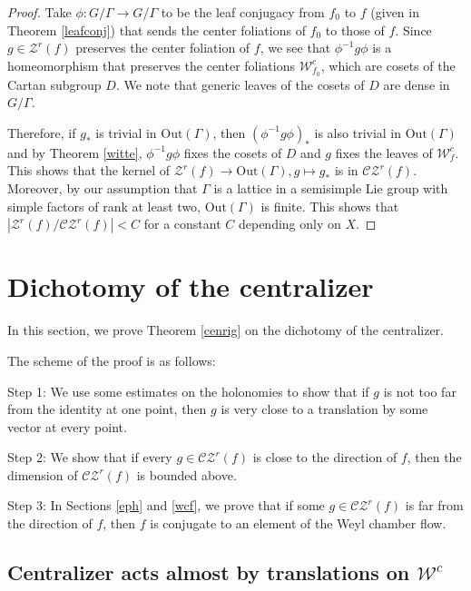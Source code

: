 \documentclass[11pt]{amsart}
\numberwithin{equation}{section}
\newcommand{\W}{\mathcal{W}}
\newcommand{\CZ}{\mathcal{CZ}}
\theoremstyle{plain}
\begin{document}
\begin{proof}
Take $\phi: G/\Gamma\to G/\Gamma$ to be the leaf conjugacy from $f_0$ to $f$ (given in Theorem \ref{leafconj}) that sends the center foliations of $f_0$ to those of $f$. Since $g\in \mathcal{Z}^r(f)$ preserves the center foliation of $f$, we see that $\phi^{-1} g\phi$ is a homeomorphism that preserves the center foliations $\W^c_{f_0}$, which are cosets of the Cartan subgroup $D$. We note that generic leaves of the cosets of $D$ are dense in $G/\Gamma$.

Therefore, if $g_*$ is trivial in $\mathrm{Out}(\Gamma)$, then $(\phi^{-1} g\phi)_*$ is also trivial in $\mathrm{Out}(\Gamma)$ and by Theorem \ref{witte}, $\phi^{-1} g\phi$ fixes the cosets of $D$ and $g$ fixes the leaves of $\W^c_f$. This shows that the kernel of $\mathcal Z^r(f)\to \mathrm{Out}(\Gamma), g\mapsto g_*$ is in $\CZ^r(f)$. Moreover, by our assumption that $\Gamma$ is a lattice in a semisimple Lie group with simple factors of rank at least two, $\mathrm{Out}(\Gamma)$ is finite. This shows that $|\mathcal{Z}^r(f)/\CZ^r(f)|<C$ for a constant $C$ depending only on $X$. 
\end{proof}





\section{Dichotomy of the centralizer}\label{dichcen}

In this section, we prove Theorem \ref{cenrig} on the dichotomy of the centralizer. 

The scheme of the proof is as follows:

Step 1: We use some estimates on the holonomies to show that if $g$ is not too far from the identity at one point, then $g$ is very close to a translation by some vector at every point.



Step 2: We show that if every $g\in \CZ^r(f)$ is close to the direction of $f$, then the dimension of $\CZ^r(f)$ is bounded above. 

Step 3: In Sections \ref{eph} and \ref{wcf}, we prove that if some $g\in \CZ^r(f)$ is far from the direction of $f$, then $f$ is conjugate to an element of the Weyl chamber flow.

\subsection{Centralizer acts almost by translations on $\W^c$}
\end{document}
